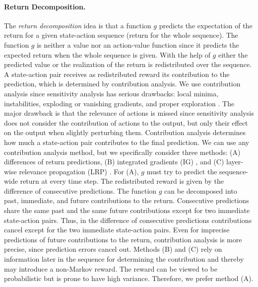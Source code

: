 \documentclass{article}
\begin{document}
\paragraph{Return Decomposition.}
\label{para:returnDecomposition}
The {\em return decomposition} idea is 
that a function $g$ predicts the expectation
of the return
for a given state-action sequence (return for the whole sequence).
The function $g$ is neither a value nor an action-value function
since it predicts the expected return when the whole sequence is given.
With the help of $g$ either the predicted value or
the realization of the return is redistributed over
the sequence. 
A state-action pair receives as redistributed reward
its contribution to the prediction, which
is determined by contribution analysis.
We use contribution analysis since sensitivity analysis has serious drawbacks:
local minima, instabilities, exploding or vanishing
gradients, and proper exploration
\cite{Hochreiter:90,Schmidhuber:90diff}.
The major drawback is that
the relevance of actions is missed
since sensitivity analysis does not consider the contribution of actions to 
the output,
but only their effect on the output when slightly perturbing them.
Contribution analysis
determines how much a state-action pair contributes to the final prediction.
We can use any contribution analysis method, but
we specifically consider three methods:
(A) differences of return predictions,
(B) integrated gradients (IG) \cite{Sundararajan:17}, and
(C) layer-wise relevance propagation (LRP) \cite{Bach:15}.
For (A), $g$ must try to predict the  
sequence-wide return at every time step.
The redistributed reward is given by 
the difference of consecutive predictions. 
The function $g$ can be decomposed into
past, immediate, and future contributions to the return.
Consecutive predictions share the same past and the same
future contributions except for two immediate state-action pairs.
Thus, in the difference of consecutive predictions 
contributions cancel except for the two immediate state-action pairs.
Even for imprecise predictions of future contributions to the return, 
contribution analysis is more precise, 
since prediction errors cancel out.
Methods (B) and (C) rely on information later in the sequence for
determining the contribution and thereby may introduce a non-Markov reward.
The reward can be viewed to be probabilistic
but is prone to have high variance. 
Therefore, we prefer method (A).
\end{document}
